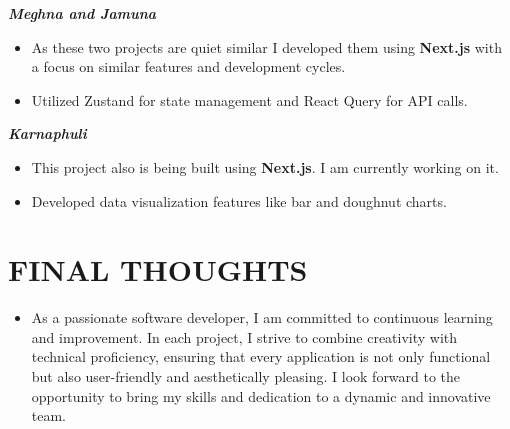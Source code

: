 \documentclass[letterpaper,10pt]{article}
\newcommand{\resumeItem}[1]{
  \item\small{
    {#1 \vspace{-1pt}}
  }
}
\newcommand{\resumeItemListStart}{\begin{itemize}}
\newcommand{\resumeItemListEnd}{\end{itemize}\vspace{0pt}}
\begin{document}
    \textit{\textbf{Meghna and Jamuna}}
    \resumeItemListStart
        \resumeItem {As these two projects are quiet similar I developed them using \textbf{Next.js} with a focus on similar features and development cycles.}
        \resumeItem {Utilized Zustand for state management and React Query for API calls.}
    \resumeItemListEnd

    \textit{\textbf{Karnaphuli}}
    \resumeItemListStart
        \resumeItem {This project also is being built using \textbf{Next.js}. I am currently working on it.}
        \resumeItem {Developed data visualization features like bar and doughnut charts.}
    \resumeItemListEnd


\section{FINAL THOUGHTS}
 \begin{itemize}[leftmargin=0in, label={}]
    \resumeItem {As a passionate software developer, I am committed to continuous learning and improvement. In each project, I strive to combine creativity with technical proficiency, ensuring that every application is not only functional but also user-friendly and aesthetically pleasing. I look forward to the opportunity to bring my skills and dedication to a dynamic and innovative team.}
    
 \end{itemize}

  

\vspace{-8pt}
\end{document}

